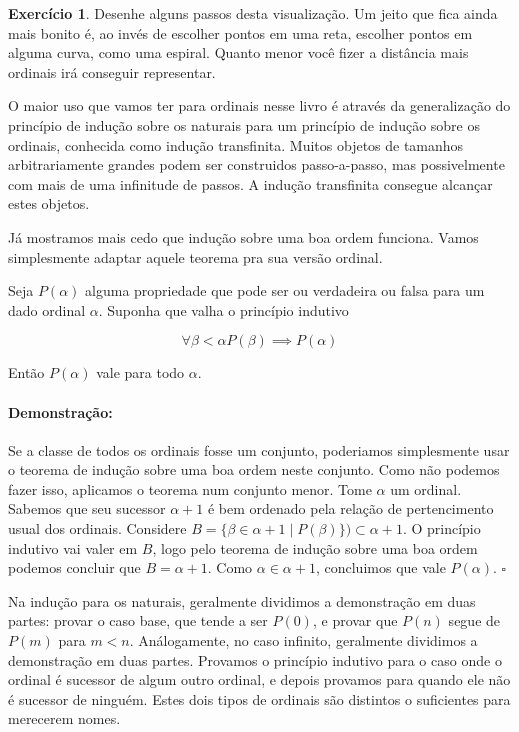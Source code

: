 \documentclass[11pt]{article}
\newcommand{\pulinho}{\vspace{.5cm}}
\newcommand{\luafacil}{
\emoji{waxing-crescent-moon}
}
\theoremstyle{definition}
\theoremstyle{definition}
\newtheorem*{theorem*}{Teorema}
\newenvironment{teorema*}{
\definecolor{shadecolor}{HTML}{f59aa3}
\begin{shaded}
\begin{theorem*}
}
{
\end{theorem*}
\end{shaded}
}
\theoremstyle{definition}
\theoremstyle{definition}
\theoremstyle{definition}
\theoremstyle{definition}
\theoremstyle{definition}
\theoremstyle{definition}
\theoremstyle{definition}
\theoremstyle{definition}
\theoremstyle{definition}
\theoremstyle{definition}
\newenvironment{prova}{\paragraph{Demonstração:}}{\hfill$\square$ 
\pulinho
}
\theoremstyle{definition}
\newtheorem{exersisio}{Exercício}
\newenvironment{exercicio}{
\definecolor{shadecolor}{HTML}{CFB5FF}
\begin{shaded}
\begin{exersisio}
}
{
\end{exersisio}
\end{shaded}
}
\begin{document}
\begin{exercicio}
  \luafacil Desenhe alguns passos desta visualização. Um jeito que fica ainda mais bonito é, ao invés de escolher pontos em uma reta, escolher pontos em alguma curva, como uma espiral. Quanto menor você fizer a distância mais ordinais irá conseguir representar.
\end{exercicio}

O maior uso que vamos ter para ordinais nesse livro é através da generalização do princípio de indução sobre os naturais para um princípio de indução sobre os ordinais, conhecida como indução transfinita. Muitos objetos de tamanhos arbitrariamente grandes podem ser construidos passo-a-passo, mas possivelmente com mais de uma infinitude de passos. A indução transfinita consegue alcançar estes objetos.

Já mostramos mais cedo que indução sobre uma boa ordem funciona. Vamos simplesmente adaptar aquele teorema pra sua versão ordinal.

\begin{teorema*}
  Seja $P(\alpha)$ alguma propriedade que pode ser ou verdadeira ou falsa para um dado ordinal $\alpha$. Suponha que valha o princípio indutivo

  \[ \forall \beta < \alpha P(\beta)  \implies P(\alpha) \]

  Então $P(\alpha)$ vale para todo $\alpha$.
\end{teorema*}
\begin{prova}
  Se a classe de todos os ordinais fosse um conjunto, poderiamos simplesmente usar o teorema de indução sobre uma boa ordem neste conjunto. Como não podemos fazer isso, aplicamos o teorema num conjunto menor. Tome $\alpha$ um ordinal. Sabemos que seu sucessor $\alpha + 1$ é bem ordenado pela relação de pertencimento usual dos ordinais. Considere $B = \{ \beta \in \alpha + 1 \mid P(\beta)\}) \subset \alpha + 1$. O princípio indutivo vai valer em $B$, logo pelo teorema de indução sobre uma boa ordem podemos concluir que $B = \alpha + 1$. Como $\alpha \in \alpha + 1$, concluimos que vale $P(\alpha)$.
\end{prova}

Na indução para os naturais, geralmente dividimos a demonstração em duas partes: provar o caso base, que tende a ser $P(0)$, e provar que $P(n)$ segue de $P(m)$ para $m<n$. Análogamente, no caso infinito, geralmente dividimos a demonstração em duas partes. Provamos o princípio indutivo para o caso onde o ordinal é sucessor de algum outro ordinal, e depois provamos para quando ele não é sucessor de ninguém. Estes dois tipos de ordinais são distintos o suficientes para merecerem nomes.
\end{document}
